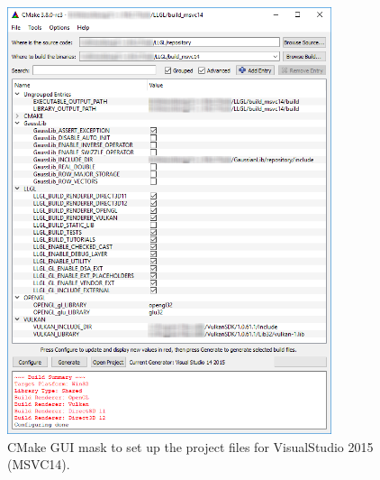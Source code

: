 \documentclass{article}
\begin{document}
\begin{figure}[ht]
	\centering
	\includegraphics[width=0.85\textwidth]{cmake_mask1c}
	\caption{CMake GUI mask to set up the project files for VisualStudio 2015 (MSVC14).}
	\label{fig:cmake_mask1}
\end{figure}
\end{document}
